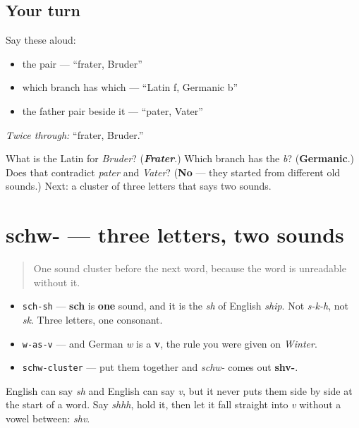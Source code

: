 \subsection*{Your turn}
Say these aloud:

\begin{itemize}
\raggedright
  \item the pair — \textquotedblleft{}frater, Bruder\textquotedblright{}
  \item which branch has which — \textquotedblleft{}Latin f, Germanic b\textquotedblright{}
  \item the father pair beside it — \textquotedblleft{}pater, Vater\textquotedblright{}
\end{itemize}

\emph{Twice through:} \textquotedblleft{}frater, Bruder.\textquotedblright{}

\begin{tcolorbox}[breakable,colback=teal!4,colframe=teal!35!black,title={Before you move on}]
What is the Latin for \emph{Bruder}? (\emph{\textbf{Frater}}.) Which branch has the \emph{b}? (\textbf{Germanic}.) Does that contradict \emph{pater} and \emph{Vater}? (\textbf{No} — they started from different old sounds.) Next: a cluster of three letters that says two sounds.
\end{tcolorbox}
\section[schw-]{schw- — three letters, two sounds}

\label{lesson:GE-C10-schw}



\begin{quote}
One sound cluster before the next word, because the word is unreadable without it.
\end{quote}

\begin{sounds}
\begin{itemize}
\raggedright
  \item \texttt{sch-sh} — \textbf{sch} is \textbf{one} sound, and it is the \emph{sh} of English \emph{ship}. Not \emph{s-k-h}, not \emph{sk}. Three letters, one consonant.
  \item \texttt{w-as-v} — and German \emph{w} is a \textbf{v}, the rule you were given on \emph{Winter}.
  \item \texttt{schw-cluster} — put them together and \emph{schw-} comes out \textbf{shv-}.
\end{itemize}

English can say \emph{sh} and English can say \emph{v}, but it never puts them side by side at the start of a word. Say \emph{shhh}, hold it, then let it fall straight into \emph{v} without a vowel between: \emph{shv}.
\end{sounds}

